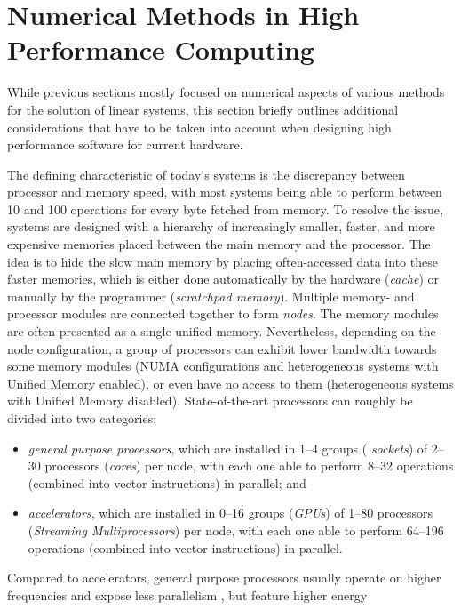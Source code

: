 \section{Numerical Methods in High Performance Computing}

While previous sections mostly focused on numerical aspects of various methods
for the solution of linear systems, this section briefly outlines additional
considerations that have to be taken into account when designing high
performance software for current hardware.

The defining characteristic of today's systems is the discrepancy between
processor and memory speed, with most systems being able to perform between 10
and 100 operations for every byte fetched from memory. To resolve the issue,
systems are designed with a hierarchy of increasingly smaller, faster, and more
expensive memories placed between the main memory and the processor. The idea is
to hide the slow main memory by placing often-accessed data into these faster
memories, which is either done automatically by the hardware (\emph{cache}) or
manually by the programmer (\emph{scratchpad memory}). Multiple memory- and
processor modules are connected together to form \emph{nodes}. The memory
modules are often presented as a single unified memory. Nevertheless, depending
on the node configuration, a group of processors can exhibit lower
bandwidth towards some memory modules (\eg NUMA configurations and
heterogeneous systems with Unified Memory enabled), or even have no access
to them (\eg heterogeneous systems with Unified Memory disabled).
State-of-the-art processors can roughly be divided into two categories:
\begin{itemize}
\item \emph{general purpose processors}, which are installed in 1--4 groups (\ie
\emph{sockets}) of 2--30 processors (\ie \emph{cores}) per node, with each one
able to perform 8--32 operations (combined into vector instructions) in
parallel; and
\item \emph{accelerators}, which are installed in 0--16 groups (\eg \emph{GPUs})
of 1--80 processors (\eg \emph{Streaming Multiprocessors}) per node, with each
one able to perform 64--196 operations (combined into vector instructions) in
parallel.
\end{itemize}
Compared to accelerators, general purpose processors usually operate on higher
frequencies and expose less parallelism  , but feature higher energy
